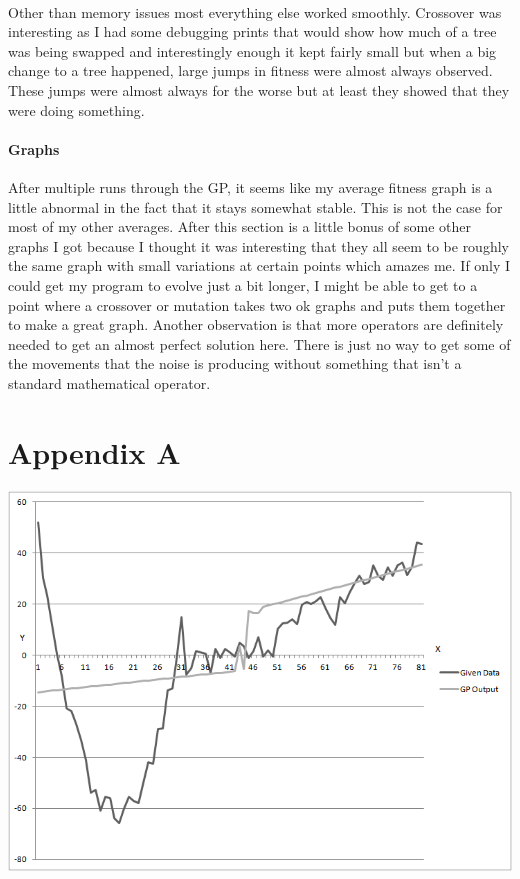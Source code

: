 \documentclass[11pt]{article} %
\begin{document}
\paragraph{} Other than memory issues most everything else worked smoothly. Crossover was interesting as I had some debugging prints that would show how much of a tree was being swapped and interestingly enough it kept fairly small but when a big change to a tree happened, large jumps in fitness were almost always observed. These jumps were almost always for the worse but at least they showed that they were doing something.

\paragraph{Graphs} After multiple runs through the GP, it seems like my average fitness graph is a little abnormal in the fact that it stays somewhat stable. This is not the case for most of my other averages. After this section is a little bonus of some other graphs I got because I thought it was interesting that they all seem to be roughly the same graph with small variations at certain points which amazes me. If only I could get my program to evolve just a bit longer, I might be able to get to a point where a crossover or mutation takes two ok graphs and puts them together to make a great graph. Another observation is that more operators are definitely needed to get an almost perfect solution here. There is just no way to get some of the movements that the noise is producing without something that isn't a standard mathematical operator.

\section{Appendix A}

\begin{center}
\includegraphics[scale = 0.75]{Graph2}
\end{center}
\pagebreak
\end{document}
